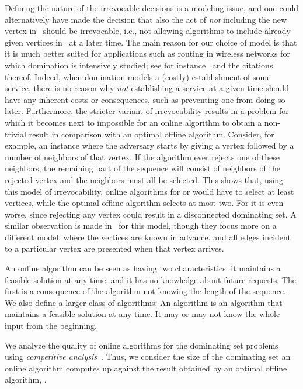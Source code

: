 Defining the nature of the irrevocable decisions is a
modeling issue, and one could alternatively have made the decision
that also the act of \emph{not} including the new vertex in~ should
be irrevocable, i.e., not allowing algorithms to include already given
vertices in~ at a later time.  The main reason for our choice of
model is that it is much better suited for applications such as
routing in wireless networks for which domination is intensively
studied; see for instance~\cite{DB97} and the citations
thereof. Indeed, when domination models a (costly) establishment of
some service, there is no reason why \emph{not} establishing a service
at a given time should have any inherent costs or consequences, such
as preventing one from doing so later.  Furthermore, the stricter
variant of irrevocability results in a problem for which it becomes
next to impossible for an online algorithm to obtain a non-trivial
result in comparison with an optimal offline algorithm.
Consider, for example, an instance
where the adversary starts by giving a vertex followed by a number
of neighbors of that vertex.  If the algorithm ever rejects one of
these neighbors, the remaining part of the sequence will consist of
neighbors of the rejected vertex and the neighbors must all be selected.  
This shows that, using this model
of irrevocability, online algorithms for \ds or \tds would have to
select at least  vertices, while the optimal offline algorithm
selects at most two.
For \cds it is even worse, since rejecting any vertex
could result in a disconnected dominating set.
A similar observation is made in~\cite{KT97} for this model, though they
 focus more on a different model, where the vertices are known in
advance, and all edges incident to a particular vertex are presented
when that vertex arrives.

An online algorithm can be seen as having two characteristics:
it maintains a feasible solution at any time, and it has no knowledge
about future requests.
The first is a consequence of the algorithm not knowing the length of
the sequence.
We also define a larger class of algorithms:
An {\em \incr} algorithm is an algorithm that maintains a feasible
solution at any time.
It may or may not know the whole input from the beginning.

We analyze the quality of online algorithms for the dominating set problems
using \emph{competitive analysis}~\cite{ST85j,KMRS88j}.
Thus, we consider the size of the dominating set an online algorithm
computes up against the result obtained by an optimal offline algorithm, \opt.

